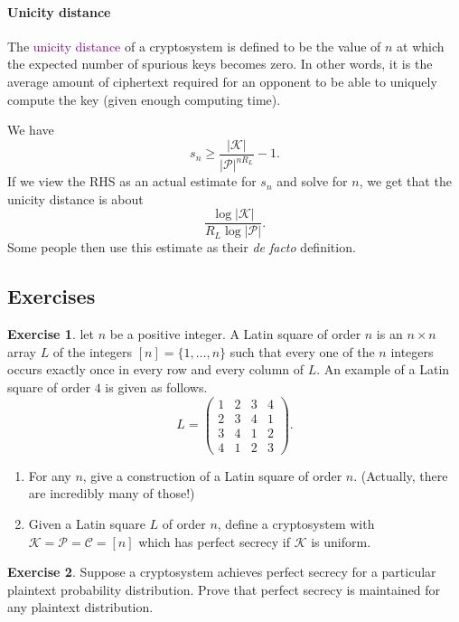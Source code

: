 \documentclass[a4paper, 11pt, openany]{book}
\numberwithin{equation}{section}
\theoremstyle{plain}
\theoremstyle{definition}
\newtheorem{exercise}   {Exercise}  [section]
\newcommand{\Define}[1]{\textcolor{purple}{#1}}
\newcommand{\alphabet}[1]{\mathcal{#1}}
\begin{document}
\paragraph{Unicity distance}
The \Define{unicity distance} of a cryptosystem is defined to be the value of $n$ at which the expected number of spurious keys becomes zero. In other words, it is the average amount of ciphertext required for an opponent to be able to uniquely compute the key (given enough computing time).

We have
\[
	s_n \ge \frac{ |\alphabet{K}| }{ |\alphabet{P}|^{n R_L} } - 1.
\]
If we view the RHS as an actual estimate for $s_n$ and solve for $n$, we get that the unicity distance is about
\[
	\frac{ \log |\alphabet{K}| }{ R_L \log |\alphabet{P}| }.
\]
Some people then use this estimate as their \textit{de facto} definition.




\subsection{Exercises}




\begin{exercise}
let $n$ be a positive integer. A Latin square of order $n$ is an $n \times n$ array $L$ of the integers $[n] = \{1, \dots, n\}$ such that every one of the $n$ integers occurs exactly once in every row and every column of $L$. An example of a Latin square of order $4$ is given as follows.
\[
	L = \begin{pmatrix}
	1 & 2 & 3 & 4\\
	2 & 3 & 4 & 1\\
	3 & 4 & 1 & 2\\
	4 & 1 & 2 & 3
	\end{pmatrix}.
\]

\begin{enumerate}
	\item For any $n$, give a construction of a Latin square of order $n$. (Actually, there are incredibly many of those!)
	
	\item Given a Latin square $L$ of order $n$, define a cryptosystem with $\alphabet{K} = \alphabet{P} = \alphabet{C} = [n]$ which has perfect secrecy if $\alphabet{K}$ is uniform. 
\end{enumerate}
\end{exercise}




\begin{exercise}
Suppose a cryptosystem achieves perfect secrecy for a particular plaintext probability distribution. Prove that perfect secrecy is maintained for any plaintext distribution.
\end{exercise}
\end{document}
